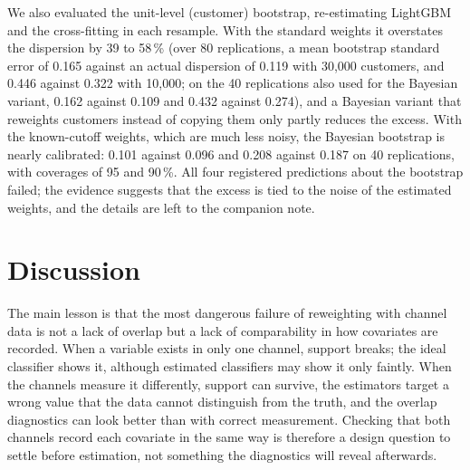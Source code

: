\documentclass[11pt,a4paper]{article}
\theoremstyle{plain}
\theoremstyle{definition}
\begin{document}
We also evaluated the unit-level (customer) bootstrap, re-estimating LightGBM and the cross-fitting in each resample. With the standard weights it overstates the dispersion by 39 to 58\,\% (over 80 replications, a mean bootstrap standard error of 0.165 against an actual dispersion of 0.119 with 30{,}000 customers, and 0.446 against 0.322 with 10{,}000; on the 40 replications also used for the Bayesian variant, 0.162 against 0.109 and 0.432 against 0.274), and a Bayesian variant that reweights customers instead of copying them only partly reduces the excess. With the known-cutoff weights, which are much less noisy, the Bayesian bootstrap is nearly calibrated: 0.101 against 0.096 and 0.208 against 0.187 on 40 replications, with coverages of 95 and 90\,\%. All four registered predictions about the bootstrap failed; the evidence suggests that the excess is tied to the noise of the estimated weights, and the details are left to the companion note.
\section{Discussion}\label{sec:discussion}

The main lesson is that the most dangerous failure of reweighting with channel data is not a lack of overlap but a lack of comparability in how covariates are recorded. When a variable exists in only one channel, support breaks; the ideal classifier shows it, although estimated classifiers may show it only faintly. When the channels measure it differently, support can survive, the estimators target a wrong value that the data cannot distinguish from the truth, and the overlap diagnostics can look better than with correct measurement. Checking that both channels record each covariate in the same way is therefore a design question to settle before estimation, not something the diagnostics will reveal afterwards.
\end{document}

